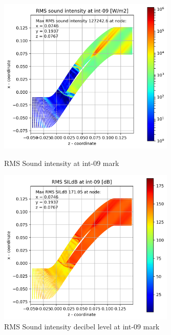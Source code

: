 \begin{figure}[ht]
  \centering
  \includegraphics[width=0.75\textwidth]{Figures/int-09-rms-sil.png}
  \caption{RMS Sound intensity at int-09 mark} \label{int-09-rms-sil}
  
  \vspace*{\floatsep}%

  \includegraphics[width=0.75\textwidth]{Figures/int-09-rms-sildb.png}
  \caption{RMS Sound intensity decibel level at int-09 mark} \label{int-09-rms-sildb}
\end{figure}


